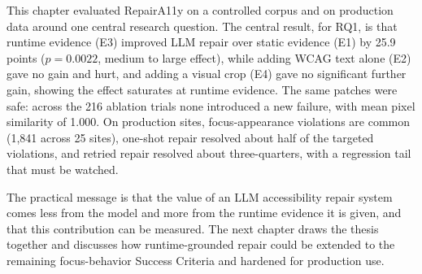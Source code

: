 \documentclass[11pt]{article}
\begin{document}
This chapter evaluated RepairA11y on a controlled corpus and on production data around
one central research question. The central result, for RQ1, is that runtime evidence
(E3) improved LLM repair over static evidence (E1) by 25.9 points ($p = 0.0022$,
medium to large effect), while adding WCAG text alone (E2) gave no gain and hurt, and
adding a visual crop (E4) gave no significant further gain, showing the effect
saturates at runtime evidence. The same patches were safe: across the 216 ablation
trials none introduced a new failure, with mean pixel similarity of 1.000. On
production sites, focus-appearance violations are common (1{,}841 across 25 sites),
one-shot repair resolved about half of the targeted violations, and retried repair
resolved about three-quarters, with a regression tail that must be watched.

The practical message is that the value of an LLM accessibility repair system comes
less from the model and more from the runtime evidence it is given, and that this
contribution can be measured. The next chapter draws the thesis together and discusses
how runtime-grounded repair could be extended to the remaining focus-behavior Success
Criteria and hardened for production use.
\end{document}
